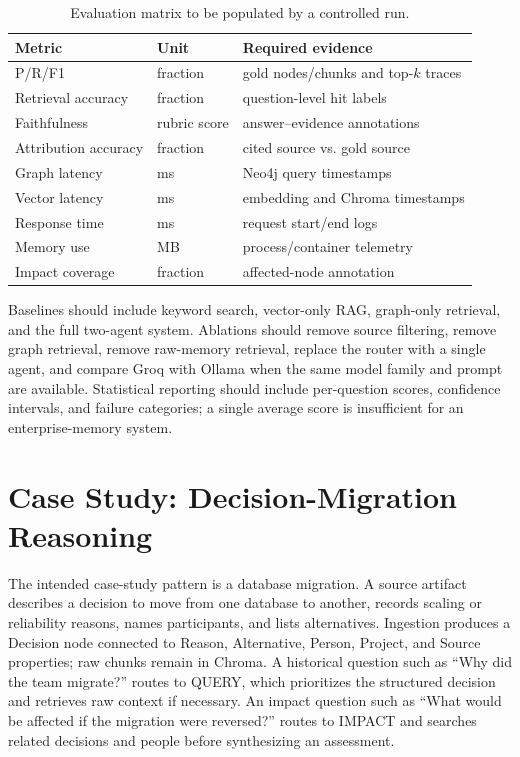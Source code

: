 \documentclass[conference]{IEEEtran}
\begin{document}
\begin{table}[t]
\caption{Evaluation matrix to be populated by a controlled run.}
\label{tab:eval}
\centering\scriptsize
\begin{tabular}{p{1.45cm}p{2.15cm}p{2.55cm}}
\toprule
Metric & Unit & Required evidence\\
\midrule
P/R/F1 & fraction & gold nodes/chunks and top-$k$ traces\\
Retrieval accuracy & fraction & question-level hit labels\\
Faithfulness & rubric score & answer--evidence annotations\\
Attribution accuracy & fraction & cited source vs. gold source\\
Graph latency & ms & Neo4j query timestamps\\
Vector latency & ms & embedding and Chroma timestamps\\
Response time & ms & request start/end logs\\
Memory use & MB & process/container telemetry\\
Impact coverage & fraction & affected-node annotation\\
\bottomrule
\end{tabular}
\end{table}

Baselines should include keyword search, vector-only RAG, graph-only retrieval, and the full two-agent system. Ablations should remove source filtering, remove graph retrieval, remove raw-memory retrieval, replace the router with a single agent, and compare Groq with Ollama when the same model family and prompt are available. Statistical reporting should include per-question scores, confidence intervals, and failure categories; a single average score is insufficient for an enterprise-memory system.

\section{Case Study: Decision-Migration Reasoning}
The intended case-study pattern is a database migration. A source artifact describes a decision to move from one database to another, records scaling or reliability reasons, names participants, and lists alternatives. Ingestion produces a Decision node connected to Reason, Alternative, Person, Project, and Source properties; raw chunks remain in Chroma. A historical question such as ``Why did the team migrate?'' routes to QUERY, which prioritizes the structured decision and retrieves raw context if necessary. An impact question such as ``What would be affected if the migration were reversed?'' routes to IMPACT and searches related decisions and people before synthesizing an assessment.
\end{document}
